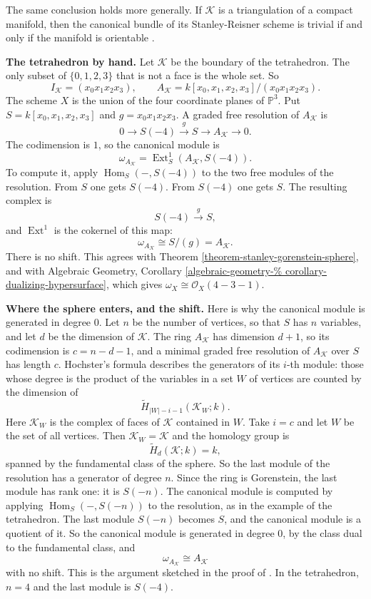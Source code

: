 The same conclusion holds more generally. If
$\mathcal{K}$ is a triangulation of a compact
manifold, then the canonical bundle of its
Stanley-Reisner scheme is trivial if and only
if the manifold is orientable \cite[Theorem
6.1]{BAYER19911}.

\medskip\noindent
{\bf The tetrahedron by hand.}
Let $\mathcal{K}$ be the boundary of the
tetrahedron. The only subset of
$\{0,1,2,3\}$ that is not a face is the
whole set. So
$$
I_{\mathcal{K}}=(x_0x_1x_2x_3),
\qquad
A_{\mathcal{K}}=
k[x_0,x_1,x_2,x_3]/(x_0x_1x_2x_3).
$$
The scheme $X$ is the union of the four
coordinate planes of $\mathbb{P}^3$. Put
$S=k[x_0,x_1,x_2,x_3]$ and
$g=x_0x_1x_2x_3$. A graded free
resolution of $A_{\mathcal{K}}$ is
$$
0\to S(-4)\xrightarrow{g}S\to
A_{\mathcal{K}}\to 0.
$$
The codimension is $1$, so the canonical
module is
$$
\omega_{A_{\mathcal{K}}}=
\operatorname{Ext}^1_S
(A_{\mathcal{K}},S(-4)).
$$
To compute it, apply
$\operatorname{Hom}_S(-,S(-4))$ to the
two free modules of the resolution. From
$S$ one gets $S(-4)$. From $S(-4)$ one
gets $S$. The resulting complex is
$$
S(-4)\xrightarrow{g}S,
$$
and $\operatorname{Ext}^1$ is the
cokernel of this map:
$$
\omega_{A_{\mathcal{K}}}\cong
S/(g)=A_{\mathcal{K}}.
$$
There is no shift. This agrees with
Theorem
\ref{theorem-stanley-gorenstein-sphere},
and with Algebraic Geometry, Corollary
\ref{algebraic-geometry-%
corollary-dualizing-hypersurface},
which gives
$\omega_X\cong\mathcal{O}_X(4-3-1)$.

\medskip\noindent
{\bf Where the sphere enters, and the shift.}
Here is why the canonical module is generated
in degree $0$. Let $n$ be the number of
vertices, so that $S$ has $n$ variables, and
let $d$ be the dimension of $\mathcal{K}$.
The ring $A_{\mathcal{K}}$ has dimension
$d+1$, so its codimension is $c=n-d-1$, and a
minimal graded free resolution of
$A_{\mathcal{K}}$ over $S$ has length $c$.
Hochster's formula \cite[Chapter II, Theorem
4.8]{stanley-cca} describes the generators of
its $i$-th module: those whose degree is the
product of the variables in a set $W$ of
vertices are counted by the dimension of
$$
\widetilde{H}_{|W|-i-1}
(\mathcal{K}_W;k).
$$
Here $\mathcal{K}_W$ is the complex of faces
of $\mathcal{K}$ contained in $W$. Take $i=c$
and let $W$ be the set of all vertices. Then
$\mathcal{K}_W=\mathcal{K}$ and the homology
group is
$$
\widetilde{H}_{d}(\mathcal{K};k)=k,
$$
spanned by the fundamental class of the
sphere. So the last module of the resolution
has a generator of degree $n$. Since the ring
is Gorenstein, the last module has rank one:
it is $S(-n)$. The canonical module is
computed by applying
$\operatorname{Hom}_S(-,S(-n))$ to the
resolution, as in the example of the
tetrahedron. The last module $S(-n)$ becomes
$S$, and the canonical module is a quotient
of it. So the canonical module is generated
in degree $0$, by the class dual to the
fundamental class, and
$$
\omega_{A_{\mathcal{K}}}\cong A_{\mathcal{K}}
$$
with no shift. This is the argument sketched
in the proof of \cite[Theorem
6.1]{BAYER19911}. In the tetrahedron, $n=4$
and the last module is $S(-4)$.

